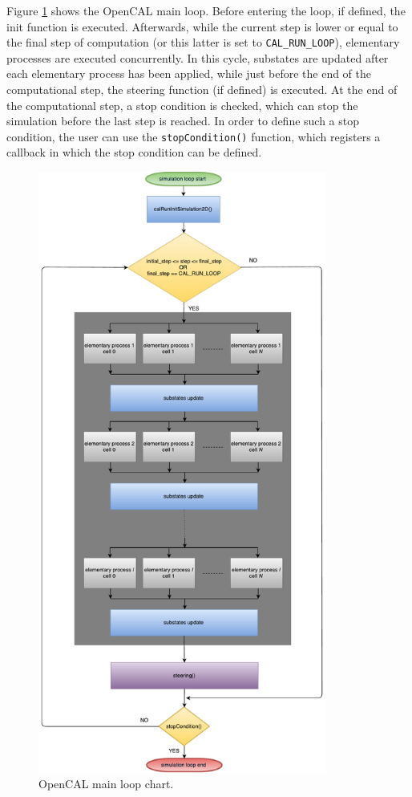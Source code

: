 Figure \ref{fig:opencal_main_loop} shows the OpenCAL main loop. Before
entering the loop, if defined, the init function is
executed. Afterwards, while the current step is lower or equal to the
final step of computation (or this latter is set to
\verb'CAL_RUN_LOOP'), elementary processes are executed
concurrently. In this cycle, substates are updated after each
elementary process has been applied, while just before the end of the
computational step, the steering function (if defined) is executed. At
the end of the computational step, a stop condition is checked, which
can stop the simulation before the last step is reached. In order to
define such a stop condition, the user can use the
\verb'stopCondition()' function, which registers a callback in which
the stop condition can be defined.

\begin{figure}[htbp]
  \centering
  \includegraphics[width=9.5cm]{./images/OpenCAL/opencal_main_loop.pdf}
  \caption{OpenCAL main loop chart.}
  \label{fig:opencal_main_loop}
\end{figure}


